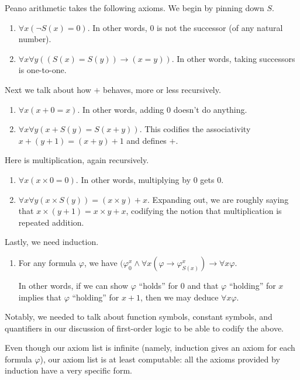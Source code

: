 \begin{axiom}
	Peano arithmetic takes the following axioms. We begin by pinning down $S$.
	\begin{enumerate}[label=(S\arabic*)]
		\item $\forall x(\lnot S(x)=0)$. In other words, $0$ is not the successor (of any natural number).
		\item $\forall x\forall y((S(x)=S(y))\to (x=y))$. In other words, taking successors is one-to-one.
	\end{enumerate}
	Next we talk about how $+$ behaves, more or less recursively.
	\begin{enumerate}[label=(A\arabic*)]
		\item $\forall x(x+0=x)$. In other words, adding $0$ doesn't do anything.
		\item $\forall x\forall y(x+S(y)=S(x+y))$. This codifies the associativity $x+(y+1)=(x+y)+1$ and defines $+$.
	\end{enumerate}
	Here is multiplication, again recursively.
	\begin{enumerate}[label=(M\arabic*)]
		\item $\forall x(x\times0=0)$. In other words, multiplying by $0$ gets $0$.
		\item $\forall x\forall y(x\times S(y))=(x\times y)+x$. Expanding out, we are roughly saying that $x\times(y+1)=x\times y+x$, codifying the notion that multiplication is repeated addition.
	\end{enumerate}
	Lastly, we need induction.
	\begin{enumerate}[label=(IND)]
		\item For any formula $\varphi$, we have $(\varphi^x_0\land\forall x(\varphi\to\varphi^x_{S(x)})\to\forall x\varphi$.

		In other words, if we can show $\varphi$ ``holds'' for $0$ and that $\varphi$ ``holding'' for $x$ implies that $\varphi$ ``holding'' for $x+1$, then we may deduce $\forall x\varphi$.
	\end{enumerate}
\end{axiom}
Notably, we needed to talk about function symbols, constant symbols, and quantifiers in our discussion of first-order logic to be able to codify the above.
\begin{remark}
	Even though our axiom list is infinite (namely, induction gives an axiom for each formula $\varphi$), our axiom list is at least computable: all the axioms provided by induction have a very specific form.
\end{remark}

